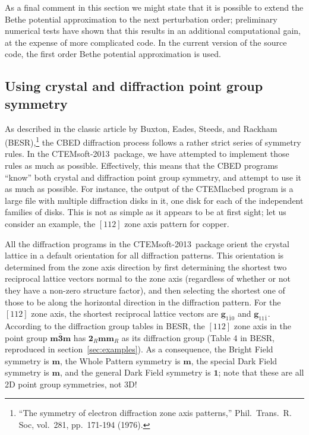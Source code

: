 \documentclass[DIV=calc, paper=letter, fontsize=11pt]{scrartcl}	 %
\newcommand{\ctp}{\textsf{CTEMsoft-2013}}
\begin{document}
As a final comment in this section we might state that it is possible to extend the Bethe potential approximation to the next perturbation
order; preliminary numerical tests have shown that this results in an additional computational gain, at the expense of more complicated
code.  In the current version of the source code, the first order Bethe potential approximation is used.

\subsection{Using crystal and diffraction point group symmetry}
As described in the classic article by Buxton, Eades, Steeds, and Rackham (BESR),\footnote{
``The symmetry of electron diffraction zone axis patterns,'' Phil.\ Trans.\ R. Soc, vol.\ 281, pp.\
171-194 (1976).} the CBED diffraction process follows a rather strict series of symmetry rules.
In the \ctp\ package, we have attempted to implement those rules as much as possible.  Effectively,
this means that the CBED programs ``know'' both crystal and diffraction point group symmetry, and
attempt to use it as much as possible.  For instance, the output of the \textsf{CTEMlacbed} program is a 
large file with multiple diffraction disks in it, one disk for each of the independent families 
of disks.  This is not as simple as it appears to be at first sight;  let us consider an example, 
the $[112]$ zone axis pattern for copper.

All the diffraction programs in the \ctp\ package orient the crystal lattice in a default orientation 
for all diffraction patterns.  This orientation is determined from the zone axis direction by first 
determining the shortest two reciprocal lattice vectors normal to the zone axis (regardless of whether or not they have a non-zero structure factor), and then selecting
the shortest one of those to be along the horizontal direction in the diffraction pattern.  For the 
$[112]$ zone axis, the shortest reciprocal lattice vectors are $\mathbf{g}_{1\bar{1}0}$ and 
$\mathbf{g}_{11\bar{1}}$.  According to the diffraction group tables in BESR, the $[112]$ zone axis 
in the point group $\mathbf{m\bar{3}m}$ has $\mathbf{2}_R\mathbf{mm}_R$ as its diffraction group (Table 4 in BESR, reproduced in
section~\ref{sec:examples}).  As a 
consequence, the Bright Field symmetry is $\mathbf{m}$, the Whole Pattern symmetry is $\mathbf{m}$, the special
Dark Field symmetry is $\mathbf{m}$, and the general Dark Field symmetry is $\mathbf{1}$; note that these are
all 2D point group symmetries, not 3D!  
\end{document}
